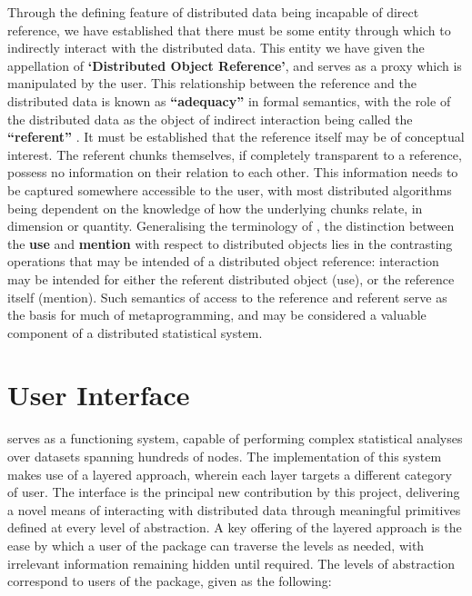 \documentclass[letterpaper, inpress]{jds} %
\begin{document}
Through the defining feature of distributed data being incapable of direct reference, we have established that there must be some entity through which to indirectly interact with the distributed data.
This entity we have given the appellation of \textbf{`Distributed Object Reference'}, and serves as a proxy which is manipulated by the user.
This relationship between the reference and the distributed data is known as \textbf{``adequacy''} in formal semantics, with the role of the distributed data as the object of indirect interaction being called the \textbf{``referent''} \citep{gordon1984}.
It must be established that the reference itself may be of conceptual interest.
The referent chunks themselves, if completely transparent to a reference, possess no information on their relation to each other.
This information needs to be captured somewhere accessible to the user, with most distributed algorithms being dependent on the knowledge of how the underlying chunks relate, in dimension or quantity. 
Generalising the terminology of \citet{quine1979}, the distinction between the \textbf{use} and \textbf{mention} with respect to  distributed objects lies in the contrasting operations that may be intended of a distributed object reference: interaction may be intended for either the referent distributed object (use), or the reference itself (mention).
Such semantics of access to the reference and referent serve as the basis for much of metaprogramming, and may be considered a valuable component of a distributed statistical system.

\section{User Interface}\label{sec:ui}

 serves as a functioning system, capable of performing complex statistical analyses over datasets spanning hundreds of nodes.
The implementation of this system makes use of a layered approach, wherein each layer targets a different category of user.
The  interface is the principal new contribution by this project, delivering a novel means of interacting with distributed data through meaningful primitives defined at every level of abstraction.
A key offering of the layered approach is the ease by which a user of the package can traverse the levels as needed, with irrelevant information remaining hidden until required.
The levels of abstraction correspond to users of the package, given as the following:
\end{document}

